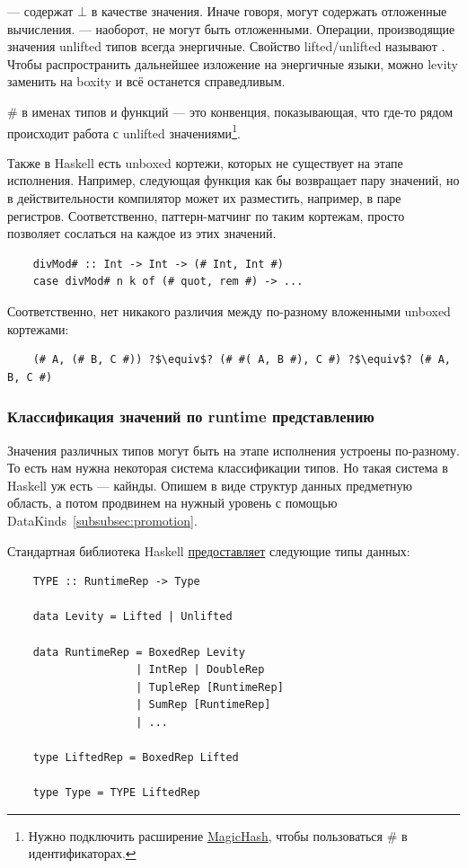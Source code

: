  --- содержат $\bot$ в качестве значения.
Иначе говоря, могут содержать отложенные вычисления.
 --- наоборот, не могут быть отложенными.
Операции, производящие значения unlifted типов всегда энергичные.
Свойство lifted/unlifted называют .
Чтобы распространить дальнейшее изложение на энергичные языки, можно levity заменить на boxity и всё останется справедливым.

\# в именах типов и функций --- это конвенция, показывающая, что где-то рядом происходит работа с unlifted значениями\footnote{Нужно подключить расширение \href{https://ghc.gitlab.haskell.org/ghc/doc/users_guide/exts/magic_hash.html}{MagicHash}, чтобы пользоваться \# в идентификаторах.}.

Также в Haskell есть unboxed кортежи, которых не существует на этапе исполнения.
Например, следующая функция как бы возвращает пару значений, но в действительности компилятор может их разместить, например, в паре регистров.
Соответственно, паттерн-матчинг по таким кортежам, просто позволяет сослаться на каждое из этих значений.
\begin{verbatim}
    divMod# :: Int -> Int -> (# Int, Int #)
    case divMod# n k of (# quot, rem #) -> ...
\end{verbatim}
Соответственно, нет никакого различия между по-разному вложенными unboxed кортежами:
\begin{verbatim}
    (# A, (# B, C #)) ?$\equiv$? (# #( A, B #), C #) ?$\equiv$? (# A, B, C #)
\end{verbatim}

\subsubsection{Классификация значений по runtime представлению}

Значения различных типов могут быть на этапе исполнения устроены по-разному.
То есть нам нужна некоторая система классификации типов.
Но такая система в Haskell уж есть --- кайнды.
Опишем в виде структур данных предметную область, а потом продвинем на нужный уровень с помощью DataKinds~\ref{subsubsec:promotion}.

Стандартная библиотека Haskell \href{https://downloads.haskell.org/ghc/latest/docs/users_guide/exts/representation_polymorphism.html}{предоставляет} следующие типы данных:
\begin{verbatim}
    TYPE :: RuntimeRep -> Type

    data Levity = Lifted | Unlifted

    data RuntimeRep = BoxedRep Levity
                    | IntRep | DoubleRep
                    | TupleRep [RuntimeRep]
                    | SumRep [RuntimeRep]
                    | ...

    type LiftedRep = BoxedRep Lifted

    type Type = TYPE LiftedRep
\end{verbatim}

